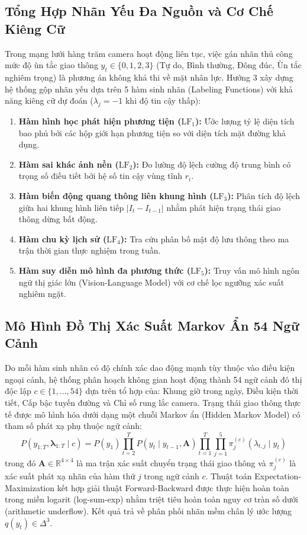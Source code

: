 \documentclass[11pt,a4paper]{article}
\begin{document}
\subsection{Tổng Hợp Nhãn Yếu Đa Nguồn và Cơ Chế Kiêng Cữ}
Trong mạng lưới hàng trăm camera hoạt động liên tục, việc gán nhãn thủ công mức độ ùn tắc giao thông $y_t \in \{0, 1, 2, 3\}$ (Tự do, Bình thường, Đông đúc, Ùn tắc nghiêm trọng) là phương án không khả thi về mặt nhân lực. Hướng 3 xây dựng hệ thống gộp nhãn yếu dựa trên 5 hàm sinh nhãn (Labeling Functions) với khả năng kiêng cữ dự đoán ($\lambda_j = -1$ khi độ tin cậy thấp):
\begin{enumerate}
    \item \textbf{Hàm hình học phát hiện phương tiện ($\text{LF}_1$):} Ước lượng tỷ lệ diện tích bao phủ bởi các hộp giới hạn phương tiện so với diện tích mặt đường khả dụng.
    \item \textbf{Hàm sai khác ảnh nền ($\text{LF}_2$):} Đo lường độ lệch cường độ trung bình có trọng số điều tiết bởi hệ số tin cậy vùng tĩnh $r_i$.
    \item \textbf{Hàm biến động quang thông liên khung hình ($\text{LF}_3$):} Phân tích độ lệch giữa hai khung hình liên tiếp $|I_t - I_{t-1}|$ nhằm phát hiện trạng thái giao thông dừng bất động.
    \item \textbf{Hàm chu kỳ lịch sử ($\text{LF}_4$):} Tra cứu phân bố mật độ lưu thông theo ma trận thời gian thực nghiệm trong tuần.
    \item \textbf{Hàm suy diễn mô hình đa phương thức ($\text{LF}_5$):} Truy vấn mô hình ngôn ngữ thị giác lớn (Vision-Language Model) với cơ chế lọc ngưỡng xác suất nghiêm ngặt.
\end{enumerate}

\subsection{Mô Hình Đồ Thị Xác Suất Markov Ẩn 54 Ngữ Cảnh}
Do mỗi hàm sinh nhãn có độ chính xác dao động mạnh tùy thuộc vào điều kiện ngoại cảnh, hệ thống phân hoạch không gian hoạt động thành 54 ngữ cảnh đô thị độc lập $c \in \{1, \dots, 54\}$ dựa trên tổ hợp của: Khung giờ trong ngày, Điều kiện thời tiết, Cấp bậc tuyến đường và Chỉ số rung lắc camera.
Trạng thái giao thông thực tế được mô hình hóa dưới dạng một chuỗi Markov ẩn (Hidden Markov Model) có tham số phát xạ phụ thuộc ngữ cảnh:
\begin{equation}
    P(y_{1:T}, \bm{\lambda}_{1:T} \mid c) = P(y_1) \prod_{t=2}^T P(y_t \mid y_{t-1}, \mathbf{A}) \prod_{t=1}^T \prod_{j=1}^5 \pi_j^{(c)}(\lambda_{t, j} \mid y_t)
\end{equation}
trong đó $\mathbf{A} \in \mathbb{R}^{4 \times 4}$ là ma trận xác suất chuyển trạng thái giao thông và $\pi_j^{(c)}$ là xác suất phát xạ nhãn của hàm thứ $j$ trong ngữ cảnh $c$.
Thuật toán Expectation-Maximization kết hợp giải thuật Forward-Backward được thực hiện hoàn toàn trong miền logarit (log-sum-exp) nhằm triệt tiêu hoàn toàn nguy cơ tràn số dưới (arithmetic underflow). Kết quả trả về phân phối nhãn mềm chân lý ước lượng $q(y_t) \in \Delta^3$.
\end{document}
